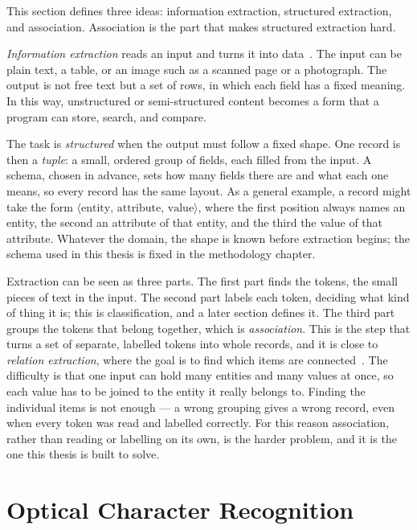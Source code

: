 This section defines three ideas: information extraction, structured extraction,
and association. Association is the part that makes structured extraction hard.

\emph{Information extraction} reads an input and turns it into
data~\cite{sarawagi2008ie}. The input can be plain text, a table, or an image such
as a scanned page or a photograph. The output is not free text but a set of rows,
in which each field has a fixed meaning. In this way, unstructured or
semi-structured content becomes a form that a program can store, search, and
compare.

The task is \emph{structured} when the output must follow a fixed shape. One
record is then a \emph{tuple}: a small, ordered group of fields, each filled from
the input. A schema, chosen in advance, sets how many fields there are and what
each one means, so every record has the same layout. As a general example, a
record might take the form
$\langle\text{entity},\,\text{attribute},\,\text{value}\rangle$, where the first
position always names an entity, the second an attribute of that entity, and the
third the value of that attribute. Whatever the domain, the shape is known before
extraction begins; the schema used in this thesis is fixed in the methodology
chapter.

Extraction can be seen as three parts. The first part finds the tokens, the small
pieces of text in the input. The second part labels each token, deciding what kind
of thing it is; this is classification, and a later section defines it. The third
part groups the tokens that belong together, which is \emph{association}. This is
the step that turns a set of separate, labelled tokens into whole records, and it
is close to \emph{relation extraction}, where the goal is to find which items are
connected~\cite{pawar2017relation}. The difficulty is that one input can hold many
entities and many values at once, so each value has to be joined to the entity it
really belongs to. Finding the individual items is not enough --- a wrong grouping
gives a wrong record, even when every token was read and labelled correctly. For
this reason association, rather than reading or labelling on its own, is the harder
problem, and it is the one this thesis is built to solve.

\section{Optical Character Recognition}\label{sec:bgd-ocr}

